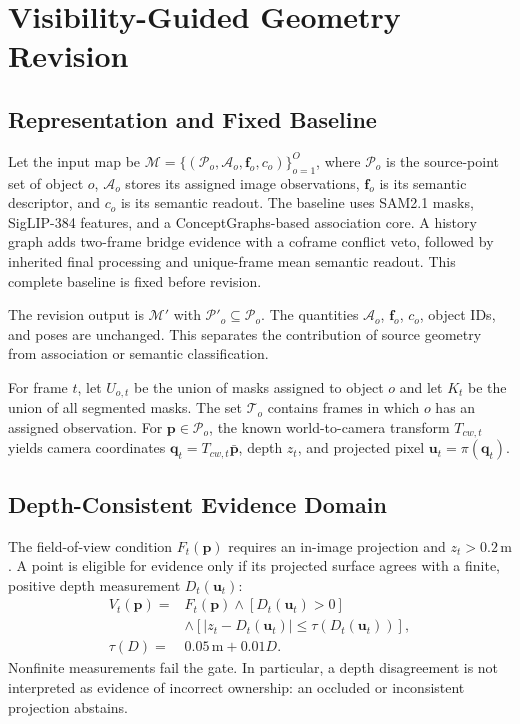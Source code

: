 \section{Visibility-Guided Geometry Revision}
\label{sec:method}


\subsection{Representation and Fixed Baseline}
Let the input map be $\mathcal M=\{(\mathcal P_o,\mathcal A_o,\mathbf f_o,c_o)\}_{o=1}^{O}$, where $\mathcal P_o$ is the source-point set of object $o$, $\mathcal A_o$ stores its assigned image observations, $\mathbf f_o$ is its semantic descriptor, and $c_o$ is its semantic readout. The baseline uses SAM2.1 masks, SigLIP-384 features, and a ConceptGraphs-based association core. A history graph adds two-frame bridge evidence with a coframe conflict veto, followed by inherited final processing and unique-frame mean semantic readout. This complete baseline is fixed before revision.

The revision output is $\mathcal M'$ with $\mathcal P'_o\subseteq\mathcal P_o$. The quantities $\mathcal A_o$, $\mathbf f_o$, $c_o$, object IDs, and poses are unchanged. This separates the contribution of source geometry from association or semantic classification.

For frame $t$, let $U_{o,t}$ be the union of masks assigned to object $o$ and let $K_t$ be the union of all segmented masks. The set $\mathcal T_o$ contains frames in which $o$ has an assigned observation. For $\mathbf p\in\mathcal P_o$, the known world-to-camera transform $T_{cw,t}$ yields camera coordinates $\mathbf q_t=T_{cw,t}\bar{\mathbf p}$, depth $z_t$, and projected pixel $\mathbf u_t=\pi(\mathbf q_t)$.

\subsection{Depth-Consistent Evidence Domain}
The field-of-view condition $F_t(\mathbf p)$ requires an in-image projection and $z_t>0.2\,\mathrm m$. A point is eligible for evidence only if its projected surface agrees with a finite, positive depth measurement $D_t(\mathbf u_t)$:
\begin{equation}
\begin{split}
V_t(\mathbf p)={}&F_t(\mathbf p)\land[D_t(\mathbf u_t)>0]\\
&\land[|z_t-D_t(\mathbf u_t)|\leq\tau(D_t(\mathbf u_t))],\\
\tau(D)={}&0.05\,\mathrm m+0.01D.
\end{split}
\label{eq:visibility}
\end{equation}
Nonfinite measurements fail the gate. In particular, a depth disagreement is not interpreted as evidence of incorrect ownership: an occluded or inconsistent projection abstains.

